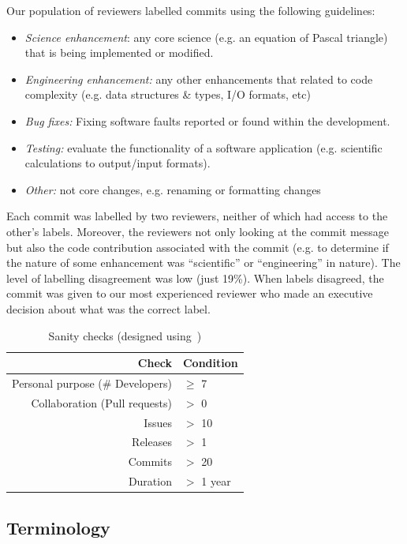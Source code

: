 \documentclass[sigconf,review,anonymous]{acmart}
\newcommand{\bi}{\begin{itemize}}
\newcommand{\ei}{\end{itemize}}
\begin{document}
 
 Our population of reviewers
 labelled commits using the following
 guidelines:
 \bi
 \item {\em Science enhancement}: any core science (e.g. an equation of Pascal triangle) that is being implemented or modified.
 \item {\em Engineering enhancement:} any other enhancements that related to code complexity (e.g.  data structures \& types, I/O formats, etc) 
\item {\em  Bug fixes:}  Fixing software faults reported or found within the development. 
\item {\em Testing: } evaluate the functionality of a software application (e.g. scientific calculations to output/input formats).
\item
{\em  Other:}  not core changes, e.g. renaming or formatting changes
\ei
Each commit was labelled by two reviewers,
neither of which had access to the other's labels. Moreover, the reviewers not only looking at the commit message but also the code contribution associated with the commit (e.g. to determine if the nature of some enhancement was 
``scientific'' or ``engineering'' in nature). The level of
labelling disagreement was low (just 19\%). When labels disagreed, the commit was given to our most experienced reviewer who made an executive decision about what
was the correct label. 



\begin{table}[!t]
\caption{Sanity checks (designed using~\cite{Kalliamvakou:2014})}\label{tbl:sanity}
\begin{center}
 \begin{tabular}{r|l}
 Check   & Condition    \\\hline
Personal purpose (\# Developers) & $\geq$ 7 \\
Collaboration (Pull requests)  & $>$ 0 \\
Issues & $>$ 10 \\
Releases &  $>$ 1 \\
Commits & $>$ 20 \\
Duration  & $>$ 1 year 
\end{tabular}%
\end{center}
\end{table}



\subsection{Terminology}
\end{document}
